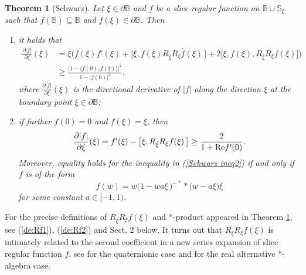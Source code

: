 \documentclass{amsart}
\newtheorem{theorem}{Theorem}[section]
\theoremstyle{definition}
\theoremstyle{remark}
\numberwithin{equation}{section}
\begin{document}
\begin{theorem}[Schwarz]\label{BSL}
Let $\xi\in \partial\mathbb B$ and $f$ be a slice regular function on $\mathbb B\cup\mathbb S_{\xi}$ such that $f(\mathbb B)\subseteq\mathbb B$ and $f(\xi)\in \partial\mathbb B$. Then
\begin{enumerate}
  \item [(i)] it holds that
  \begin{equation}\label{Schwarz ineq1}
\begin{split}
\frac{\partial |f|}{\partial \xi}(\xi)&
=\overline{\xi}\Big(f(\xi)\overline{f'(\xi)}+\big[\bar{\xi}, f(\xi)\overline{R_{\bar{\xi}}R_{\xi}f(\xi)}\,\big]+2\big[\xi, f(\xi), R_{\bar{\xi}}R_{\xi}f(\xi)\big]\Big)
\\
&\geq\frac{\big|1-\big\langle f(0), f(\xi)\big\rangle\big|^2}{1-|f(0)|^2},
\end{split}
\end{equation}
where $\frac{\partial |f|}{\partial \xi}(\xi)$ is the directional derivative of $|f|$ along the direction $\xi$  at the boundary point $\xi\in \partial\mathbb B$;

  \item [(ii)] if further  $f(0)=0$ and $f(\xi)=\xi$, then
\begin{equation}\label{Schwarz ineq2}
\frac{\partial |f|}{\partial \xi}(\xi)= f'(\xi)-\big[\xi, R_{\bar{\xi}}R_{\xi}f(\xi)\,\big] \geq\frac{2}{1+{\rm{Re}}f'(0)}.
\end{equation}
Moreover, equality holds for  the inequality in {\rm{(\ref{Schwarz ineq2})}} if and only if $f$ is of the form
\begin{equation}\label{f-expression}
f(w)=w\big(1-wa\bar{\xi}\,\big)^{-\ast}\ast\big(w-a\xi\big)\bar{\xi}
\end{equation}
for some constant $a\in [-1,1)$.
\end{enumerate}
\end{theorem}

For the precise definitions of $R_{\bar{\xi}}R_{\xi}f(\xi)$ and $\ast$-product appeared in Theorem \ref{BSL}, see (\ref{de:Rf1}), (\ref{de:Rf2}) and Sect. 2 below. It turns out that  $R_{\bar{\xi}}R_{\xi}f(\xi)$ is intimately related to  the second coefficient in a new series expansion of slice regular function $f$, see \cite[Theorem 4.1]{Stop3} for the quaternionic case and \cite[Theorem 5.4]{Ghiloni3} for the real alternative *-algebra case.
\end{document}
